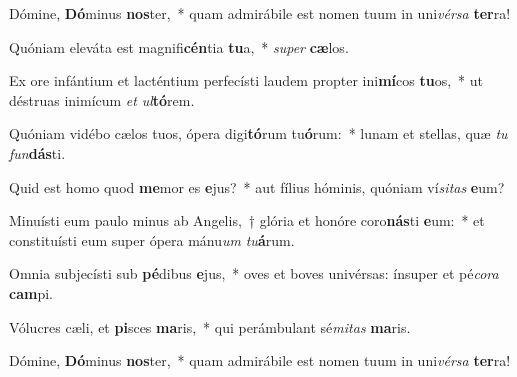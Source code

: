 \item Dómine, \textbf{Dó}minus \textbf{nos}ter,~* quam admirábile est nomen tuum in uni\textit{vér}\textit{sa} \textbf{ter}ra!
\item Quóniam eleváta est magnifi\textbf{cén}tia \textbf{tu}a,~* \textit{su}\textit{per} \textbf{cæ}los.
\item Ex ore infántium et lacténtium perfecísti laudem propter ini\textbf{mí}cos \textbf{tu}os,~* ut déstruas inimícum \textit{et} \textit{ul}\textbf{tó}rem.
\item Quóniam vidébo cælos tuos, ópera digi\textbf{tó}rum tu\textbf{ó}rum:~* lunam et stellas, quæ \textit{tu} \textit{fun}\textbf{dás}ti.
\item Quid est homo quod \textbf{me}mor es \textbf{e}jus?~* aut fílius hóminis, quóniam ví\textit{si}\textit{tas} \textbf{e}um?
\item Minuísti eum paulo minus ab Angelis,~† glória et honóre coro\textbf{nás}ti \textbf{e}um:~* et constituísti eum super ópera mánu\textit{um} \textit{tu}\textbf{á}rum.
\item Omnia subjecísti sub \textbf{pé}dibus \textbf{e}jus,~* oves et boves univérsas: ínsuper et pé\textit{co}\textit{ra} \textbf{cam}pi.
\item Vólucres cæli, et \textbf{pi}sces \textbf{ma}ris,~* qui perámbulant sé\textit{mi}\textit{tas} \textbf{ma}ris.
\item Dómine, \textbf{Dó}minus \textbf{nos}ter,~* quam admirábile est nomen tuum in uni\textit{vér}\textit{sa} \textbf{ter}ra!
